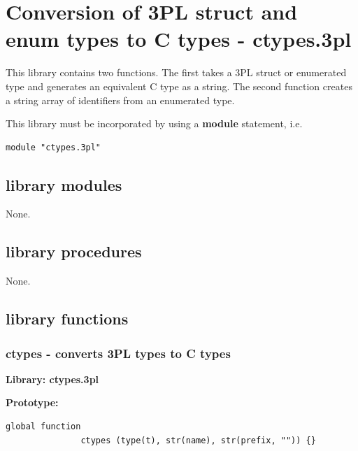 \pagebreak

\section{Conversion of 3PL struct and enum types to C types - ctypes.3pl}\label{chap:ctypes}

    This library contains two functions. The first takes a 3PL struct or
    enumerated type and generates an equivalent C type as a string.
    The second function creates a string array of identifiers from an
    enumerated type.
    
    This library must be incorporated by using a {\bf module} statement, i.e.
    \begin{lstlisting}[gobble=4, language=threepl]
       module "ctypes.3pl"
    \end{lstlisting}



    \subsection{library modules}
    
    
        None.


    \subsection{library procedures}
    
        None.




    \subsection{library functions}
    



        \subsubsection{ctypes - converts 3PL types to C types}\label{sec:lfctypes}

            {\bf Library: ctypes.3pl}

            {\bf Prototype:} \\
            \vsp
            \begin{lstlisting}[gobble=12, language=threepl]
               global function
               ctypes (type(t), str(name), str(prefix, "")) {}
            \end{lstlisting}

